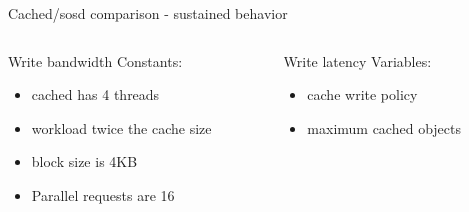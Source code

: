 \begin{frame}{Cached/sosd comparison - sustained behavior}
	\begin{columns}[t]
		\begin{column}{.5\textwidth}
			Write bandwidth
			Constants:
			\begin{itemize}
				\item cached has 4 threads
				\item workload twice the cache size
				\item block size is 4KB
				\item Parallel requests are 16
			\end{itemize}
		\end{column}
		\begin{column}{.5\textwidth}
			Write latency
			Variables:
			\begin{itemize}
				\item cache write policy
				\item maximum cached objects
			\end{itemize}
		\end{column}
	\end{columns}


\end{frame}

